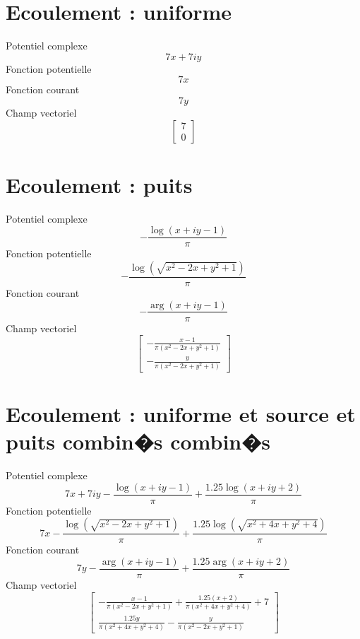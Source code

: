 \documentclass{article}
\begin{document}
\section*{Ecoulement : uniforme}
Potentiel complexe \[7 x + 7 i y\]
Fonction potentielle \[7 x\]
Fonction courant \[7 y\]
Champ vectoriel \[\left[\begin{matrix}7\\0\end{matrix}\right]\]
\section*{Ecoulement : puits}
Potentiel complexe \[- \frac{\log{\left(x + i y - 1 \right)}}{\pi}\]
Fonction potentielle \[- \frac{\log{\left(\sqrt{x^{2} - 2 x + y^{2} + 1} \right)}}{\pi}\]
Fonction courant \[- \frac{\arg{\left(x + i y - 1 \right)}}{\pi}\]
Champ vectoriel \[\left[\begin{matrix}- \frac{x - 1}{\pi \left(x^{2} - 2 x + y^{2} + 1\right)}\\- \frac{y}{\pi \left(x^{2} - 2 x + y^{2} + 1\right)}\end{matrix}\right]\]
\section*{Ecoulement : uniforme et source et puits combin�s combin�s}
Potentiel complexe \[7 x + 7 i y - \frac{\log{\left(x + i y - 1 \right)}}{\pi} + \frac{1.25 \log{\left(x + i y + 2 \right)}}{\pi}\]
Fonction potentielle \[7 x - \frac{\log{\left(\sqrt{x^{2} - 2 x + y^{2} + 1} \right)}}{\pi} + \frac{1.25 \log{\left(\sqrt{x^{2} + 4 x + y^{2} + 4} \right)}}{\pi}\]
Fonction courant \[7 y - \frac{\arg{\left(x + i y - 1 \right)}}{\pi} + \frac{1.25 \arg{\left(x + i y + 2 \right)}}{\pi}\]
Champ vectoriel \[\left[\begin{matrix}- \frac{x - 1}{\pi \left(x^{2} - 2 x + y^{2} + 1\right)} + \frac{1.25 \left(x + 2\right)}{\pi \left(x^{2} + 4 x + y^{2} + 4\right)} + 7\\\frac{1.25 y}{\pi \left(x^{2} + 4 x + y^{2} + 4\right)} - \frac{y}{\pi \left(x^{2} - 2 x + y^{2} + 1\right)}\end{matrix}\right]\]
\end{document}
